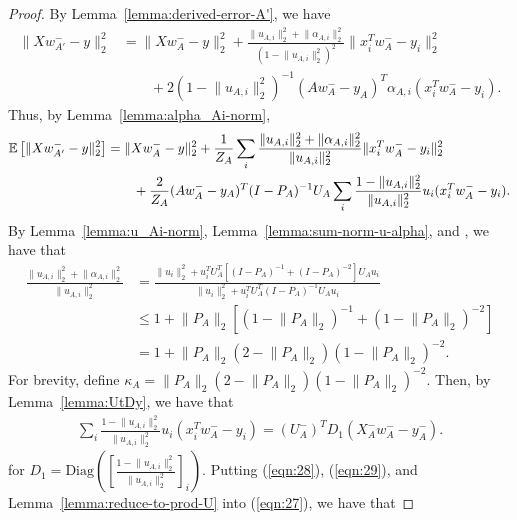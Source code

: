 \begin{proof}
    By Lemma~\ref{lemma:derived-error-A'}, we have
    \begin{align}
        \lVert Xw_{A'}^- - y\rVert^2_2 &= \lVert Xw_A^- - y \rVert^2_2 + \frac{\lVert u_{A, i} \rVert_2^2 + \lVert \alpha_{A,i} \rVert_2^2}{(1 - \lVert u_{A, i} \rVert_2^2)^2}\lVert x_i^T w_A^- - y_i \rVert_2^2 \nonumber\\
        & \qquad + 2 (1 - \lVert u_{A, i} \rVert_2^2)^{-1} (Aw_A^- - y_A)^T \alpha_{A, i} (x_i^T w_A^- - y_i).
    \end{align}
    Thus, by Lemma~\ref{lemma:alpha_Ai-norm},
    \begin{align}
         \mathbb{E}\left[ \lVert Xw^-_{A'} - y \rVert_2^2 \right] &= \lVert Xw_{A}^- - y \rVert_2^2 + {1\over Z_A} \sum_{i} {\lVert u_{A, i} \rVert_2^2 + \lVert \alpha_{A,i} \rVert_2^2\over \lVert u_{A, i} \rVert_2^2}\lVert x_i^T w_A^- - y_i \rVert_2^2 \nonumber \\
         & \qquad + {2\over Z_A} (Aw_A^- - y_A)^T (I - P_A)^{-1} U_A \sum_{i} {1 - \lVert u_{A, i} \rVert_2^2\over \lVert u_{A, i} \rVert_2^2} u_i (x_i^T w_A^- - y_i) \label{eqn:27}.
    \end{align}
    By Lemma~\ref{lemma:u_Ai-norm}, Lemma~\ref{lemma:sum-norm-u-alpha}, and \cite[Lemma 2.3.3]{GVL1996}, we have that
    \begin{align}
        \frac{\lVert u_{A, i} \rVert_2^2 + \lVert \alpha_{A,i} \rVert_2^2}{\lVert u_{A, i} \rVert_2^2} &= \frac{\lVert u_i \rVert_2^2 +  u_i^T U_A^T \left[ (I - P_A)^{-1} + (I - P_A)^{-2} \right] U_A u_i}{\lVert u_i \rVert_2^2 + u_i^T U_A^T (I - P_A)^{-1} U_A u_i}\\
        & \leq 1 + \lVert P_A \rVert_2 \left[ (1 - \lVert P_A \rVert_2)^{-1} + (1 - \lVert P_A \rVert_2)^{-2} \right] \label{eqn:28}\\
        & = 1 + \lVert P_A \rVert_2 (2 - \lVert P_A \rVert_2) (1 - \lVert P_A \rVert_2)^{-2}.
    \end{align}
    For brevity, define $\kappa_A = \lVert P_A \rVert_2 (2 - \lVert P_A \rVert_2) (1 - \lVert P_A \rVert_2)^{-2}$. Then, by Lemma~\ref{lemma:UtDy}, we have that
    \begin{align}
        \sum_{i} \frac{1 - \lVert u_{A, i} \rVert_2^2}{\lVert u_{A, i} \rVert_2^2} u_i (x_i^T w_A^- - y_i) = (U_{A}^-)^T D_1 (X_A^-w_A^- - y_A^-) \label{eqn:29}.
    \end{align}
    for $D_1 = \mathrm{Diag} \left( \left[ \frac{1 - \lVert u_{A, i} \rVert_2^2}{\lVert u_{A, i} \rVert_2^2} \right]_{i} \right)$. Putting (\ref{eqn:28}), (\ref{eqn:29}), and Lemma~\ref{lemma:reduce-to-prod-U} into (\ref{eqn:27}), we have that

\end{proof}
